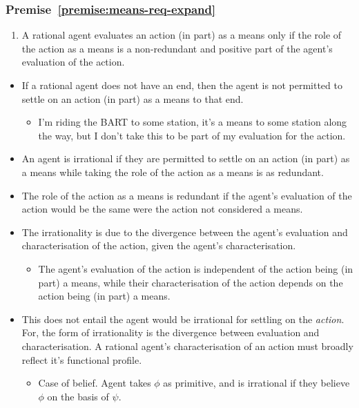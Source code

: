 \documentclass[10pt]{article}
\newcommand{\hozlinedash}[0]{%
  \noindent\hdashrule[0.5ex][c]{\textwidth}{.1pt}{2.5pt}
}
\begin{document}
\subsubsection{Premise~\ref{premise:means-req-expand}}
\label{sec:premise}


\hozlinedash

\begin{enumerate}[label=P\arabic{enumi}\alph*., ref=(P\arabic{enumi}\alph*)]
\item A rational agent evaluates an action (in part) as a means only if the role of the action as a means is a non-redundant and positive part of the agent’s evaluation of the action.
\end{enumerate}

\hozlinedash

\begin{itemize}
\item {\color{red} If a rational agent does not have an end, then the agent is not permitted to settle on an action (in part) as a means to that end.}
  \begin{itemize}
  \item I'm riding the BART to some station, it's a means to some station along the way, but I don't take this to be part of my evaluation for the action.
  \end{itemize}
\item An agent is irrational if they are permitted to settle on an action (in part) as a means while taking the role of the action as a means is as redundant.
\item The role of the action as a means is redundant if the agent's evaluation of the action would be the same were the action not considered a means.
\item The irrationality is due to the divergence between the agent's evaluation and characterisation of the action, given the agent's characterisation.
  \begin{itemize}
  \item The agent's evaluation of the action is independent of the action being (in part) a means, while their characterisation of the action depends on the action being (in part) a means.
  \end{itemize}
\item This does not entail the agent would be irrational for settling on the \emph{action}.
  For, the form of irrationality is the divergence between evaluation and characterisation.
  A rational agent's characterisation of an action must broadly reflect it's functional profile.
  \begin{itemize}
  \item Case of belief.
    Agent takes \(\phi\) as primitive, and is irrational if they believe \(\phi\) on the basis of \(\psi\).
  \end{itemize}
\end{itemize}
\end{document}
